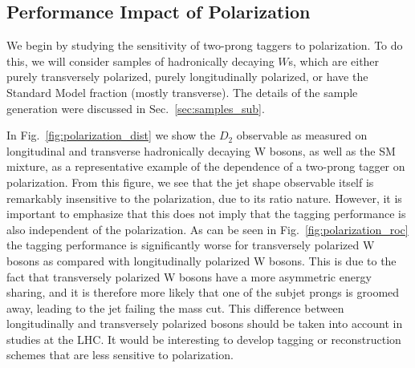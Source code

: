\documentclass[11pt,letterpaper]{article}
\DeclareRobustCommand{\Sec}[1]{Sec.~\ref{#1}}
\DeclareRobustCommand{\Fig}[1]{Fig.~\ref{#1}}
\begin{document}
\subsection{Performance Impact of Polarization}\label{sec:polar_robust}


We begin by studying the sensitivity of two-prong taggers to polarization. To do this, we will consider samples of hadronically decaying $W$s, which are either purely transversely polarized, purely longitudinally polarized, or have the Standard Model fraction (mostly transverse). The details of the sample generation were discussed in \Sec{sec:samples_sub}.

In \Fig{fig:polarization_dist} we show the $D_2$ observable as measured on longitudinal and transverse hadronically decaying W bosons, as well as the SM mixture, as a representative example of the dependence of a two-prong tagger on polarization. From this figure, we see that the jet shape observable itself is remarkably insensitive to the polarization, due to its ratio nature. However, it is important to emphasize that this does not imply that the tagging performance is also independent of the polarization. As can be seen in \Fig{fig:polarization_roc} the tagging performance is significantly worse for transversely polarized W bosons as compared with longitudinally polarized W bosons. This is due to the fact that transversely polarized W bosons have a more asymmetric energy sharing, and it is therefore more likely that one of the subjet prongs is groomed away, leading to the jet failing the mass cut. This difference between longitudinally and transversely polarized bosons should be taken into account in studies at the LHC. It would be interesting to develop tagging or reconstruction schemes that are less sensitive to polarization.
\end{document}
